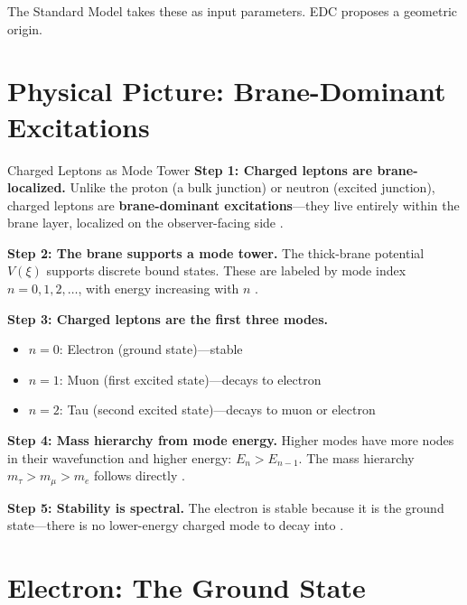 The Standard Model takes these as input parameters. EDC proposes a geometric origin.

\section{Physical Picture: Brane-Dominant Excitations}
\label{sec:lepton_physical}

\begin{mechanism}{Charged Leptons as Mode Tower}
\textbf{Step 1: Charged leptons are brane-localized.}
Unlike the proton (a bulk junction) or neutron (excited junction), charged
leptons are \textbf{brane-dominant excitations}---they live entirely within
the brane layer, localized on the observer-facing side \tagP{}.

\textbf{Step 2: The brane supports a mode tower.}
The thick-brane potential $V(\xi)$ supports discrete bound states. These are
labeled by mode index $n = 0, 1, 2, \ldots$, with energy increasing with $n$ \tagDc{}.

\textbf{Step 3: Charged leptons are the first three modes.}
\begin{itemize}[nosep]
    \item $n = 0$: Electron (ground state)---stable
    \item $n = 1$: Muon (first excited state)---decays to electron
    \item $n = 2$: Tau (second excited state)---decays to muon or electron
\end{itemize}

\textbf{Step 4: Mass hierarchy from mode energy.}
Higher modes have more nodes in their wavefunction and higher energy:
$E_n > E_{n-1}$. The mass hierarchy $m_\tau > m_\mu > m_e$ follows directly \tagI{}.

\textbf{Step 5: Stability is spectral.}
The electron is stable because it is the ground state---there is no lower-energy
charged mode to decay into \tagDc{}.
\end{mechanism}

\section{Electron: The Ground State}
\label{sec:electron}

